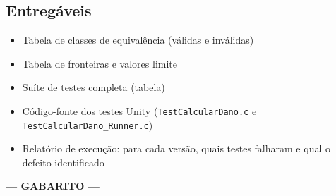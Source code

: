 \documentclass[12pt,a4paper]{article}
\newif\ifmostrarrespostas
\begin{document}
\subsection{Entregáveis}

\begin{itemize}[nosep]
  \item Tabela de classes de equivalência (válidas e inválidas)
  \item Tabela de fronteiras e valores limite
  \item Suíte de testes completa (tabela)
  \item Código-fonte dos testes Unity (\texttt{TestCalcularDano.c} e \texttt{TestCalcularDano\_Runner.c})
  \item Relatório de execução: para cada versão, quais testes falharam e qual o defeito identificado
\end{itemize}

\ifmostrarrespostas

\newpage
\begin{center}
\Large\textbf{--- GABARITO ---}
\end{center}
\vspace{0.2in}
\end{document}
